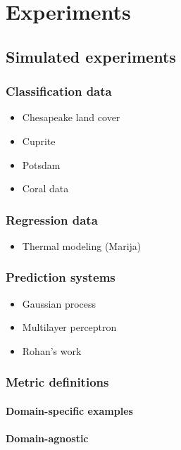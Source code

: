 \chapter{Experiments} \label{chapExperiments}

\section{Simulated experiments}
\subsection{Classification data}
\begin{itemize}
    \item{Chesapeake land cover}
    \item{Cuprite}
    \item{Potsdam}
    \item{Coral data}
\end{itemize}

\subsection{Regression data}
\begin{itemize}
    \item{Thermal modeling (Marija)}
\end{itemize}

\subsection{Prediction systems}
\begin{itemize}
    \item Gaussian process 
    \item Multilayer perceptron 
    \item Rohan's work
\end{itemize}

\subsection{Metric definitions}
\subsubsection{Domain-specific examples}
\subsubsection{Domain-agnostic}

